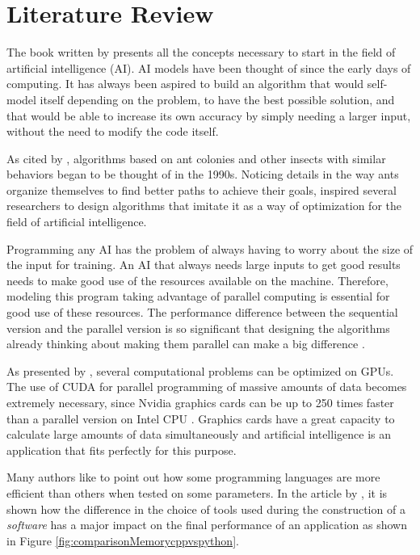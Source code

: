 \section{Literature Review}

The book written by \citeauthor{BookIA} \cite{BookIA} presents all the concepts necessary to start in the field of artificial intelligence (AI).
AI models have been thought of since the early days of computing. It has always been aspired to build an algorithm
that would self-model itself depending on the problem, to have the best possible solution,
and that would be able to increase its own accuracy by simply needing a larger input, without the need to modify
the code itself.

As cited by \citeauthor{AntColonyOptimization} \cite{AntColonyOptimization}, algorithms based on ant colonies
and other insects with similar behaviors began to be thought of in the 1990s.
Noticing details in the way ants organize themselves to find better
paths to achieve their goals, inspired several researchers to design algorithms that imitate it as a way
of optimization for the field of artificial intelligence.

Programming any AI has the problem of always having to worry about the size of the input for training.
An AI that always needs large inputs to get good results needs to make good use of the resources available on the machine.
Therefore, modeling this program taking advantage of parallel computing is essential for good use of these resources.
The performance difference between the sequential version and the parallel version is so significant that designing the algorithms
already thinking about making them parallel can make a big difference \cite{SequentialVSParallel}.

As presented by \citeauthor{ParallelComputingCUDA}, several computational problems can be optimized on GPUs.
The use of CUDA for parallel programming of massive amounts of data becomes extremely necessary, since
Nvidia graphics cards can be up to 250 times faster than a parallel version on Intel CPU \cite{ParallelComputingCUDA}.
Graphics cards have a great capacity to calculate large amounts of data simultaneously and artificial intelligence
is an application that fits perfectly for this purpose.

Many authors like to point out how some programming languages are more efficient than others
when tested on some parameters.
In the article  by \citeauthor{C++vsPython}, it is shown how the difference in the choice of tools
used during the construction of a \emph{software} has a major impact on the final performance of an application as
shown in Figure \ref{fig:comparisonMemorycppvspython}.

